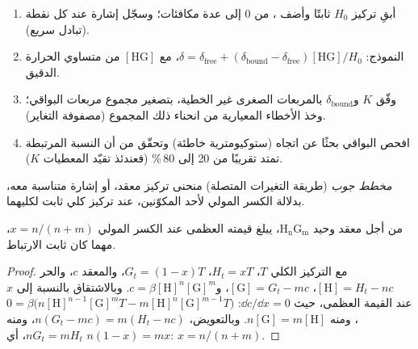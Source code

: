 \begin{method}\label{met:b3:supramolecular:nmr-titration}
\begin{enumerate}
  \item أبقِ تركيز  $H_0$ ثابتًا وأضف ، من 0 إلى عدة
        مكافئات؛ وسجّل إشارة  عند كل نقطة (تبادل سريع).
  \item النموذج: $\delta = \delta_{\mathrm{free}} + (\delta_{\mathrm{bound}} - \delta_{\mathrm{free}})[\mathrm{HG}]/H_0$، مع $[\mathrm{HG}]$ من متساوي الحرارة الدقيق.
  \item وفّق $K$ و$\delta_{\mathrm{bound}}$ بالمربعات الصغرى غير الخطية، بتصغير مجموع مربعات
        البواقي؛ وخذ الأخطاء المعيارية من انحناء ذلك المجموع
        (مصفوفة التغاير).
  \item افحص البواقي بحثًا عن اتجاه (ستوكيومترية خاطئة) وتحقّق من أن
        النسبة المرتبطة تمتد تقريبًا من 20 إلى 80\,\% (فعندئذ تقيّد المعطيات $K$).
\end{enumerate}
\end{method}

\begin{definition}\label{def:b3:supramolecular:job}
\emph{مخطط جوب} (طريقة التغيرات المتصلة) منحنى
تركيز معقد، أو إشارة متناسبة معه، بدلالة
الكسر المولي لأحد المكوّنين، عند تركيز كلي ثابت
لكليهما.
\end{definition}

\begin{proposition}\label{prop:b3:supramolecular:job}
من أجل معقد وحيد $\mathrm{H_nG_m}$، يبلغ  قيمته العظمى عند الكسر المولي 
$x = n/(n + m)$، مهما كان ثابت الارتباط.
\end{proposition}

\begin{proof}
مع التركيز الكلي $T$، $H_t = xT$، $G_t = (1 - x)T$، والمعقد $c$، والحر $[\mathrm H] = H_t - nc$،
$[\mathrm G] = G_t - mc$، و$c = \beta[\mathrm H]^n[\mathrm G]^m$. وبالاشتقاق بالنسبة إلى $x$ عند القيمة العظمى، حيث
$\dd c/\dd x = 0$: $0 = \beta\bigl(n[\mathrm H]^{n-1}[\mathrm G]^m T - m[\mathrm H]^n[\mathrm G]^{m-1}T\bigr)$، ومنه $n[\mathrm G] = m[\mathrm H]$. وبالتعويض،
$n(G_t - mc) = m(H_t - nc)$، ومنه $nG_t = mH_t$، أي $n(1 - x) = mx$: $x = n/(n + m)$.
\end{proof}

